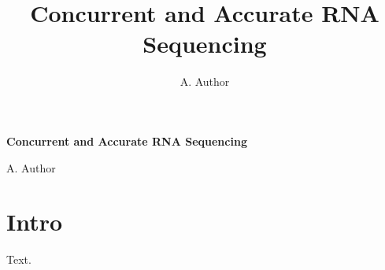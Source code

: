 \documentclass{article}
\title{Concurrent and Accurate RNA Sequencing}
\author{A. Author}
\begin{document}
\begin{titlepage}
\begin{center}
{\huge\textbf{Concurrent and Accurate RNA Sequencing}\par}
\bigskip
{\Large A. Author\par}
\end{center}
\end{titlepage}
\section{Intro}
Text.
\end{document}
